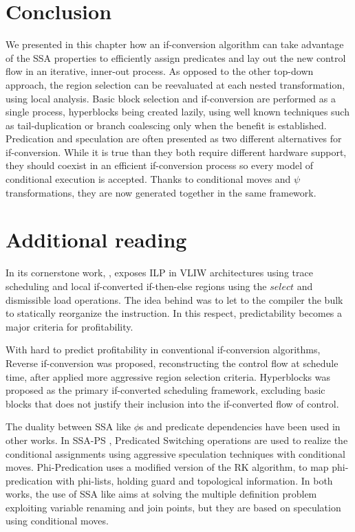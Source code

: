 \section{Conclusion} 
We presented in this chapter how an if-conversion algorithm can take advantage of the SSA properties to efficiently assign predicates and lay out the new control flow in an iterative, inner-out process. As opposed to the other top-down approach, the region selection can be reevaluated at each nested transformation, using local analysis.
Basic block selection and if-conversion are performed as a single process, hyperblocks being created lazily, using well known techniques such as tail-duplication or branch coalescing only when the benefit is established.
Predication and speculation are often presented as two different alternatives for if-conversion. While it is true than they both require different hardware support, they should coexist in an efficient if-conversion process so every model of conditional execution is accepted. Thanks to conditional moves and $\psi$ transformations, they are now generated together in the same framework.

\section{Additional reading}

In its cornerstone work, \cite{Rau:2003:IP:1074100.1074489}, exposes ILP in VLIW architectures using trace scheduling and local if-converted if-then-else regions using the $select$ and dismissible load operations. The idea behind was to let to the compiler the bulk to statically reorganize the instruction. In this respect, predictability \cite{Fisher:1992:PCB:143371.143493} becomes a major criteria for profitability.

With hard to predict profitability in conventional if-conversion algorithms, Reverse if-conversion \cite{August:1999:PRI:326224.325595} was proposed, reconstructing the control flow at schedule time, after applied more aggressive region selection criteria.
Hyperblocks \cite{Mahlke:1992:ECS:144965.144998} was proposed as the primary if-converted scheduling framework, excluding basic blocks that does not justify their inclusion into the if-converted flow of control.

The duality between SSA like $\phi$s and predicate dependencies have been used in other works. In SSA-PS \cite{Jacome01clusteredvliw}, Predicated Switching operations are used to realize the conditional assignments using aggressive speculation techniques with conditional moves. Phi-Predication \cite{Chuang03phi-predicationfor} uses a modified version of the RK algorithm, to map phi-predication with phi-lists, holding guard and topological information. In both works, the use of SSA like aims at solving the multiple definition problem exploiting variable renaming and join points, but they are based on speculation using conditional moves. 

